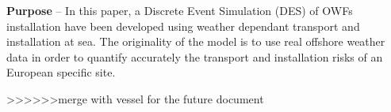 \textbf{Purpose} --
In this paper, a Discrete Event Simulation (DES) of OWFs installation have been developed using weather dependant transport and installation at sea. The originality of the model is to use real offshore weather data in order to quantify accurately the transport and installation risks of an European specific site.


>>>>>>merge with vessel for the future document